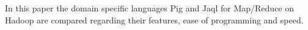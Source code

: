 In this paper the domain specific languages Pig and Jaql for Map/Reduce on Hadoop are compared regarding their features, ease of programming and speed. 